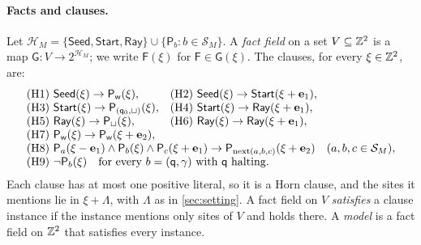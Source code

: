 \paragraph{Facts and clauses.} Let $\mathcal H_M=\{\mathsf{Seed},\mathsf{Start},\mathsf{Ray}\}\cup\{\mathsf P_b:b\in\mathcal S_M\}$. A \emph{fact field} on a set $V\subseteq\mathbb{Z}^2$ is a map $\mathsf G\colon V\to2^{\mathcal H_M}$; we write $\mathsf F(\xi)$ for $\mathsf F\in\mathsf G(\xi)$. The clauses, for every $\xi\in\mathbb{Z}^2$, are:
\[
\begin{array}{ll}
\text{(H1) } \mathsf{Seed}(\xi)\to\mathsf P_{\mathsf w}(\xi), & \text{(H2) } \mathsf{Seed}(\xi)\to\mathsf{Start}(\xi+\mathbf e_1),\\
\text{(H3) } \mathsf{Start}(\xi)\to\mathsf P_{(\mathsf q_0,\sqcup)}(\xi), & \text{(H4) } \mathsf{Start}(\xi)\to\mathsf{Ray}(\xi+\mathbf e_1),\\
\text{(H5) } \mathsf{Ray}(\xi)\to\mathsf P_{\sqcup}(\xi), & \text{(H6) } \mathsf{Ray}(\xi)\to\mathsf{Ray}(\xi+\mathbf e_1),\\
\text{(H7) } \mathsf P_{\mathsf w}(\xi)\to\mathsf P_{\mathsf w}(\xi+\mathbf e_2), & \\
\multicolumn{2}{l}{\text{(H8) } \mathsf P_a(\xi-\mathbf e_1)\wedge\mathsf P_b(\xi)\wedge\mathsf P_c(\xi+\mathbf e_1)\to\mathsf P_{\mathrm{next}(a,b,c)}(\xi+\mathbf e_2)\quad(a,b,c\in\mathcal S_M),}\\
\multicolumn{2}{l}{\text{(H9) } \neg\mathsf P_b(\xi)\quad\text{for every }b=(\mathsf q,\gamma)\text{ with }\mathsf q\text{ halting}.}
\end{array}
\]
Each clause has at most one positive literal, so it is a Horn clause, and the sites it mentions lie in $\xi+\Lambda$, with $\Lambda$ as in \cref{sec:setting}. A fact field on $V$ \emph{satisfies} a clause instance if the instance mentions only sites of $V$ and holds there. A \emph{model} is a fact field on $\mathbb{Z}^2$ that satisfies every instance.

